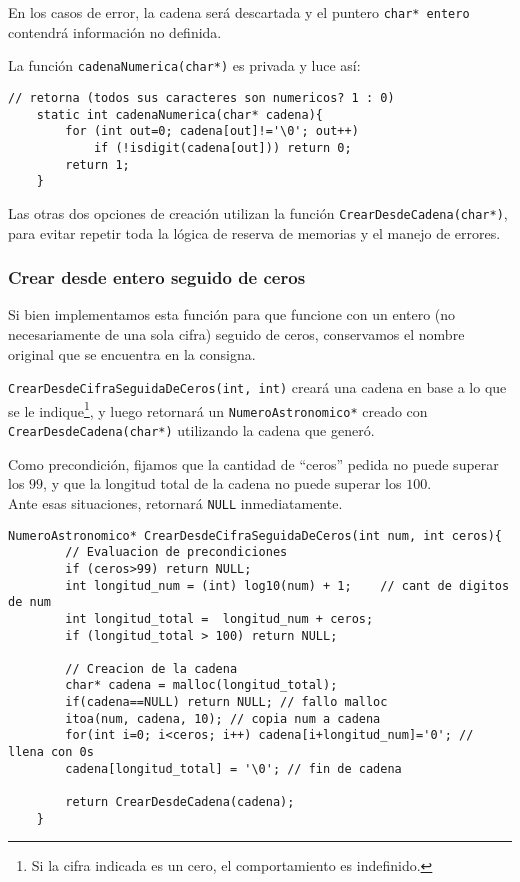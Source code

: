 \documentclass[a4paper, 12pt]{article}
\begin{document}
En los casos de error, la cadena será descartada y el puntero \verb|char* entero| contendrá información no definida.

La función \verb|cadenaNumerica(char*)| es privada y luce así:

\begin{lstlisting}[style=C]
    // retorna (todos sus caracteres son numericos? 1 : 0)
    static int cadenaNumerica(char* cadena){
        for (int out=0; cadena[out]!='\0'; out++)
            if (!isdigit(cadena[out])) return 0;
        return 1;
    }
\end{lstlisting}

Las otras dos opciones de creación utilizan la función \verb|CrearDesdeCadena(char*)|, para evitar repetir toda la lógica de reserva de memorias y el manejo de errores.

\subsubsection{Crear desde entero seguido de ceros} \label{crear-cifra-ceros}

Si bien implementamos esta función para que funcione con un entero (no necesariamente de una sola cifra) seguido de ceros, conservamos el nombre original que se encuentra en la consigna.

\verb|CrearDesdeCifraSeguidaDeCeros(int, int)| creará una cadena en base a lo que se le indique\footnote{Si la cifra indicada es un cero, el comportamiento es indefinido.}, y luego retornará un \verb|NumeroAstronomico*| creado con \verb|CrearDesdeCadena(char*)| utilizando la cadena que generó.

Como precondición, fijamos  que la cantidad de ``ceros'' pedida no puede superar los $99$, y que la longitud total de la cadena no puede superar los $100$.\\
Ante esas situaciones, retornará \verb|NULL| inmediatamente.

\begin{lstlisting}[style=C]
    NumeroAstronomico* CrearDesdeCifraSeguidaDeCeros(int num, int ceros){
        // Evaluacion de precondiciones
        if (ceros>99) return NULL;
        int longitud_num = (int) log10(num) + 1;    // cant de digitos de num
        int longitud_total =  longitud_num + ceros;
        if (longitud_total > 100) return NULL;
    
        // Creacion de la cadena
        char* cadena = malloc(longitud_total);
        if(cadena==NULL) return NULL; // fallo malloc
        itoa(num, cadena, 10); // copia num a cadena
        for(int i=0; i<ceros; i++) cadena[i+longitud_num]='0'; // llena con 0s
        cadena[longitud_total] = '\0'; // fin de cadena
        
        return CrearDesdeCadena(cadena);
    }
\end{lstlisting}
\end{document}
